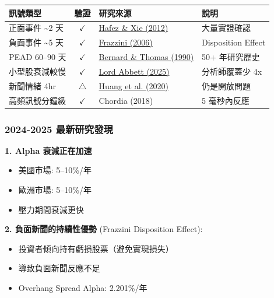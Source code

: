 \documentclass[11pt,a4paper]{article}
\newcommand{\cmark}{\textcolor{successgreen}{$\checkmark$}}
\newcommand{\wmark}{\textcolor{warningyellow}{$\triangle$}}
\begin{document}
\begin{table}[H]
\centering
\small
\begin{tabular}{@{}lcll@{}}
\toprule
\textbf{訊號類型} & \textbf{驗證} & \textbf{研究來源} & \textbf{說明} \\
\midrule
正面事件 \textasciitilde 2 天 & \cmark & \href{https://www.ravenpack.com/research/stock-market-reaction-to-news-sentiment/}{Hafez \& Xie (2012)} & 大量實證確認 \\
負面事件 \textasciitilde 5 天 & \cmark & \href{https://pages.stern.nyu.edu/~afrazzin/pdf/The\%20Disposition\%20Effect\%20and\%20Underreaction\%20to\%20news\%20-\%20Frazzini.pdf}{Frazzini (2006)} & Disposition Effect \\
PEAD 60--90 天 & \cmark & \href{https://quantpedia.com/50-years-in-pead-research/}{Bernard \& Thomas (1990)} & 50+ 年研究歷史 \\
小型股衰減較慢 & \cmark & \href{https://www.lordabbett.com/en-us/financial-advisor/insights/markets-and-economy/2025/equities-addressing-some-big-questions-about-small-caps.html}{Lord Abbett (2025)} & 分析師覆蓋少 4x \\
新聞情緒 4hr & \wmark & \href{https://www.tandfonline.com/doi/full/10.1080/1351847X.2024.2306942}{Huang et al. (2020)} & 仍是開放問題 \\
高頻訊號分鐘級 & \cmark & Chordia (2018) & 5 毫秒內反應 \\
\bottomrule
\end{tabular}
\end{table}

\subsubsection*{2024-2025 最新研究發現}

\textbf{1. Alpha 衰減正在加速}
\begin{itemize}
    \item 美國市場: 5--10\%/年
    \item 歐洲市場: 5--10\%/年
    \item 壓力期間衰減更快
\end{itemize}

\textbf{2. 負面新聞的持續性優勢} (Frazzini Disposition Effect):
\begin{itemize}
    \item 投資者傾向持有虧損股票（避免實現損失）
    \item 導致負面新聞反應不足
    \item Overhang Spread Alpha: 2.201\%/年
\end{itemize}
\end{document}
